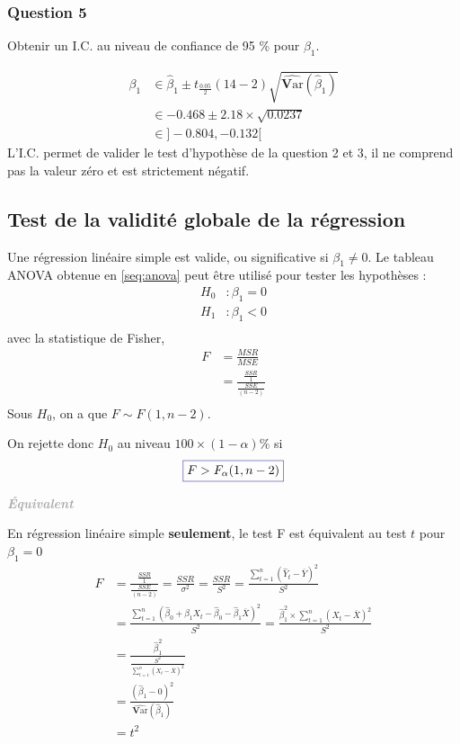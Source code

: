 \documentclass[11pt,french]{report}
\newcommand{\Var}{\mathrm{\textbf{V}ar}}
\newenvironment{moreInfo}[1]
	{\begin{mdframed}
	\textcolor{darkgray}{\huge \raisebox{-3.5pt}{\faInfo} 
	\hspace{0.5cm} \large\bfseries #1}\\[5pt]
	\normalsize
	\makebox[0.1\textwidth][l]{}	
	\begin{minipage}{10cm}}
	{	\end{minipage}
	\end{mdframed}}
\begin{document}
\subsubsection*{Question 5}
Obtenir un I.C. au niveau de confiance de 95 \% pour $\beta_1$.

\begin{align*}
\beta_1 &\in \hat{\beta}_1 \pm t_{\frac{0.05}{2}}(14-2)\sqrt{\widehat{\Var}(\hat{\beta}_1)} \\
& \in -0.468 \pm 2.18 \times \sqrt{0.0237} \\
&\in \big] -0.804, -0.132 \big[
\end{align*}
L'I.C. permet de valider le test d'hypothèse de la question 2 et 3, il ne comprend pas la valeur zéro et est strictement négatif.

\subsection{Test de la validité globale de la régression}
Une régression linéaire simple est valide, ou significative si $\beta_1 \neq 0$. Le tableau ANOVA obtenue en \ref{seq:anova} peut être utilisé pour tester les hypothèses :
\begin{align*}
H_0 &: \beta_1 = 0\\
H_1 &: \beta_1 < 0 \\
\end{align*}
avec la statistique de Fisher,
\begin{align*}
F &= \frac{MSR}{MSE} \\
&= \frac{\frac{SSR}{1}}{\frac{SSE}{(n-2)}} \\
\end{align*}
Sous $H_0$, on a que $F \sim F(1, n-2)$. \newline

On rejette donc $H_0$ au niveau $100 \times (1 - \alpha) \%$ si
\begin{equation}
\label{eq:fisher}
\color{Blue}
\boxed{\color{black}
F > F_{\alpha}(1, n-2)}
\end{equation}

\begin{moreInfo}{\color{Gray}\emph{Équivalent}
     \color{black}}
\label{equivalent}
	En régression linéaire simple \textbf{seulement}, le test F est équivalent au test $t$ pour $\beta_1 = 0$
	\begin{align*}
	F &= \frac{\frac{SSR}{1}}{\frac{SSE}{(n-2)}} = \frac{SSR}{\sigma^2} = \frac{SSR}{S^2} = \frac{\displaystyle\sum_{t=1}^n (\hat{Y}_t - \overline{Y})^2}{S^2} \\
	&= \frac{\displaystyle\sum_{t=1}^n(\hat{\beta}_0 + \hat{\beta}_1X_t - \hat{\beta}_0 - \hat{\beta}_1\overline{X})^2}{S^2} = \frac{\hat{\beta}_1^2 \times \displaystyle\sum_{t=1}^n(X_t - \overline{X})^2}{S^2} \\
	&= \frac{\hat{\beta}_1^2}{\frac{S^2}{\displaystyle\sum_{t=1}^n(X_t - \overline{X})^2}} \\
	&= \frac{(\hat{\beta}_1 - 0)^2}{\widehat{\Var}(\hat{\beta}_1)} \\
	&= t^2
	\end{align*}
\end{moreInfo}
\end{document}
